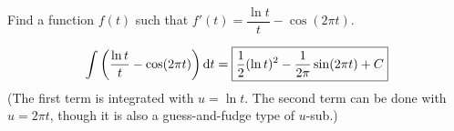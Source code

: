 \documentclass[12pt,answers]{exam}
\begin{document}
\begin{questions}
\question[10]
Find a function $f(t)$ such that $f'(t) = \dfrac{\ln t}{t} - \cos(2\pi t)$.
\begin{solution}
	\begin{align*}
		\int \left( \dfrac{\ln t}{t} - \cos(2\pi t) \right)\dif t
		= \boxed{\frac12 (\ln t)^2 - \frac{1}{2\pi} \sin(2\pi t) + C}
	\end{align*}
	(The first term is integrated with $u=\ln t$. The second term can be done with $u=2\pi t$, though it is also a guess-and-fudge type of $u$-sub.)
\end{solution}
\end{questions}
\end{document}
